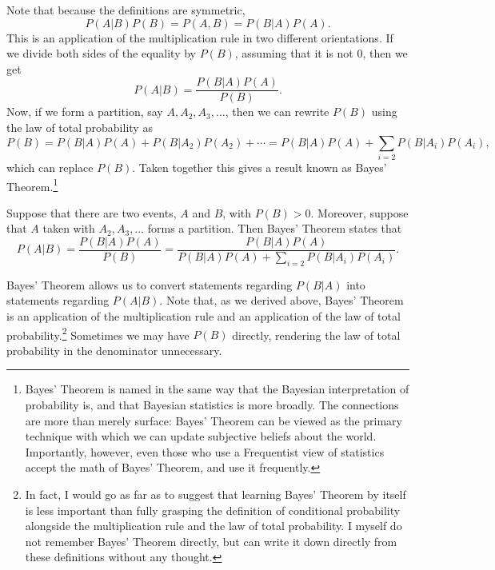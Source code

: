 \documentclass[
  letterpaper,
  DIV=11,
  numbers=noendperiod]{scrreprt}
\theoremstyle{definition}
\theoremstyle{definition}
\theoremstyle{definition}
\theoremstyle{remark}
\begin{document}
Note that because the definitions are symmetric,
\[P(A|B)P(B) = P(A,B) = P(B|A)P(A).\] This is an application of the
multiplication rule in two different orientations. If we divide both
sides of the equality by \(P(B)\), assuming that it is not \(0\), then
we get \[P(A|B) = \frac{P(B|A)P(A)}{P(B)}.\] Now, if we form a
partition, say \(A,A_2,A_3,\dots\), then we can rewrite \(P(B)\) using
the law of total probability as
\[P(B) = P(B|A)P(A) + P(B|A_2)P(A_2) + \cdots = P(B|A)P(A) + \sum_{i=2}P(B|A_i)P(A_i),\]
which can replace \(P(B)\). Taken together this gives a result known as
Bayes' Theorem.\footnote{Bayes' Theorem is named in the same way that
  the Bayesian interpretation of probability is, and that Bayesian
  statistics is more broadly. The connections are more than merely
  surface: Bayes' Theorem can be viewed as the primary technique with
  which we can update subjective beliefs about the world. Importantly,
  however, even those who use a Frequentist view of statistics accept
  the math of Bayes' Theorem, and use it frequently.}

\begin{tcolorbox}[enhanced jigsaw, coltitle=black, colframe=quarto-callout-tip-color-frame, colbacktitle=quarto-callout-tip-color!10!white, bottomrule=.15mm, opacitybacktitle=0.6, colback=white, toptitle=1mm, arc=.35mm, leftrule=.75mm, bottomtitle=1mm, opacityback=0, breakable, rightrule=.15mm, title={Bayes' Theorem}, left=2mm, titlerule=0mm, toprule=.15mm]

Suppose that there are two events, \(A\) and \(B\), with \(P(B) > 0\).
Moreover, suppose that \(A\) taken with \(A_2, A_3, \dots\) forms a
partition. Then Bayes' Theorem states that
\[P(A|B) = \frac{P(B|A)P(A)}{P(B)} = \frac{P(B|A)P(A)}{P(B|A)P(A) + \sum_{i=2} P(B|A_i)P(A_i)}.\]

\end{tcolorbox}

Bayes' Theorem allows us to convert statements regarding \(P(B|A)\) into
statements regarding \(P(A|B)\). Note that, as we derived above, Bayes'
Theorem is an application of the multiplication rule and an application
of the law of total probability.\footnote{In fact, I would go as far as
  to suggest that learning Bayes' Theorem by itself is less important
  than fully grasping the definition of conditional probability
  alongside the multiplication rule and the law of total probability. I
  myself do not remember Bayes' Theorem directly, but can write it down
  directly from these definitions without any thought.} Sometimes we may
have \(P(B)\) directly, rendering the law of total probability in the
denominator unnecessary.
\end{document}
